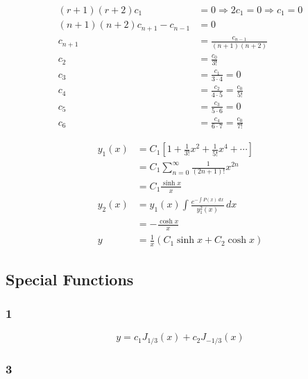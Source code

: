 \documentclass{article}
\begin{document}
\begin{align*}
  (r + 1) (r + 2) c_1                   & = 0 \Rightarrow 2 c_1 = 0 \Rightarrow c_1 = 0 \\
  (n + 1) (n + 2) c_{n + 1} - c_{n - 1} & = 0                                           \\
  c_{n + 1}                             & = \frac{c_{n - 1}}{(n + 1) (n + 2)}           \\
  c_2                                   & = \frac{c_0}{3!}                              \\
  c_3                                   & = \frac{c_1}{3 \cdot 4} = 0                   \\
  c_4                                   & = \frac{c_2}{4 \cdot 5} = \frac{c_0}{5!}      \\
  c_5                                   & = \frac{c_3}{5 \cdot 6} = 0                   \\
  c_6                                   & = \frac{c_4}{6 \cdot 7} = \frac{c_0}{7!}
\end{align*}

\begin{align*}
  y_1(x) & = C_1 \left[ 1 + \frac{1}{3!} x^2 + \frac{1}{5!} x^4 + \cdots \right] \\
         & = C_1 \sum_{n = 0}^\infty \frac{1}{(2 n + 1)!} x^{2 n}                \\
         & = C_1 \frac{\sinh x}{x}                                               \\
  y_2(x) & = y_1(x) \int \frac{e^{-\int P(x) \,dx}}{y_1^2(x)} \,dx               \\
         & = -\frac{\cosh x}{x}                                                  \\
  y      & = \frac{1}{x} (C_1 \sinh x + C_2 \cosh x)
\end{align*}

\subsection{Special Functions}

\subsubsection{1}

\[y = c_1 J_{1 / 3}(x) + c_2 J_{-1 / 3}(x)\]

\subsubsection{3}
\end{document}
